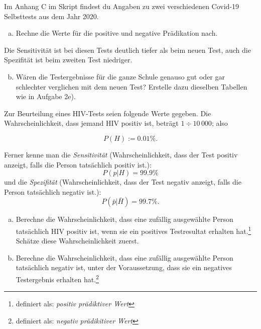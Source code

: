 \documentclass[%
11pt,%
twoside,%
titlepage,%
german,%
headsepline%
]{scrartcl}
\begin{document}
\begin{ueb}[Selbsttest 2020]
Im Anhang C im Skript findest du Angaben zu zwei verschiedenen Covid-19 Selbsttests aus dem Jahr 2020.
\begin{enumerate}[a)]
    \item Rechne die Werte für die positive und negative Prädikation nach.
\end{enumerate}
Die Sensitivität ist bei diesen Tests deutlich tiefer als beim neuen Test, auch die Spezifität ist beim zweiten Test niedriger.
\begin{enumerate}[a)]
\setcounter{enumi}{1}
\item Wären die Testergebnisse für die ganze Schule genauso gut oder gar schlechter verglichen mit dem neuen Test? Erstelle dazu dieselben Tabellen wie in Aufgabe 2e).
\end{enumerate}
\end{ueb}

\begin{ueb}
\label{ueb:hiv}
Zur
Beurteilung eines HIV-Tests seien folgende Werte gegeben. Die Wahrscheinlichkeit, dass jemand HIV positiv ist, beträgt $1\div10\,000$; also

$$P(H):=0.01\%.$$

Ferner kenne man die \emph{Sensitivität} (Wahrscheinlichkeit, dass der Test positiv anzeigt, falls die Person tatsächlich positiv ist.):
$$P(p|H)=99.9\%$$
und die \emph{Spezifität} (Wahrscheinlichkeit, dass der Test negativ anzeigt, falls die Person tatsächlich negativ ist.):
$$P(\bar{p}|\bar{H})=99.7\%.$$

\begin{enumerate}[a)]
\item Berechne die Wahrscheinlichkeit, dass eine zufällig ausgewählte Person tatsächlich HIV positiv ist, wenn sie ein positives Testresultat erhalten hat.\footnote{definiert als: \emph{positiv prädiktiver Wert}} Schätze diese Wahrscheinlichkeit zuerst.
\item Berechne die Wahrscheinlichkeit, dass eine zufällig ausgewählte Person tatsächlich negativ ist, unter der Voraussetzung, dass sie ein negatives Testergebnis erhalten hat.\footnote{definiert als: \emph{negativ prädikitiver Wert}}
\end{enumerate}

\end{ueb}

\end{document}
